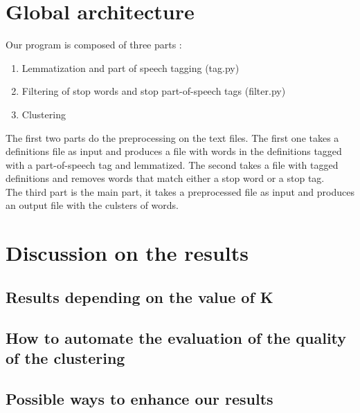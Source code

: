 \documentclass{eplDoc}
\begin{document}
\maketitle
\newpage

\section{Global architecture}

Our program is composed of three parts : 
\begin{enumerate}
	\item Lemmatization and part of speech tagging (tag.py)
	\item Filtering of stop words and stop part-of-speech tags (filter.py)
	\item Clustering  %
\end{enumerate}

The first two parts do the preprocessing on the text files. The first one takes a definitions file as input and produces a file with words in the definitions tagged with a part-of-speech tag and lemmatized. The second takes a file with tagged definitions and removes words that match either a stop word or a stop tag. \\ 

The third part is the main part, it takes a preprocessed file as input and produces an output file with the culsters of words. 

\section{Discussion on the results}

\subsection{Results depending on the value of K}

\subsection{How to automate the evaluation of the quality of the clustering} %

\subsection{Possible ways to enhance our results} %
\end{document}
